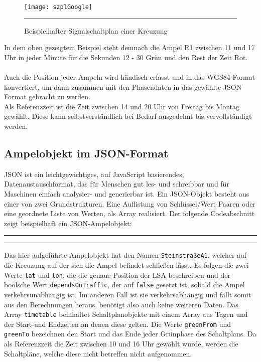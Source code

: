 \begin{figure}[H]
\centering
	\texttt{[image: szplGoogle]}
	\rule{36em}{0.5pt}
	\caption[Signalplan]{Beispielhafter Signalschaltplan einer Kreuzung}
	\label{fig:plan}	
\end{figure}
In dem oben gezeigtem Beispiel steht demnach die Ampel R1 zwischen 11 und 17 Uhr in jeder Minute für die Sekunden 12 - 30 Grün und den Rest der Zeit Rot.\\\\
Auch die Position jeder Ampeln wird händisch erfasst und in das WGS84-Format konvertiert, um dann zusammen mit den Phasendaten in das gewählte \gls{JSON}-Format gebracht zu werden.\\
Als Referenzzeit ist die Zeit zwischen 14 und 20 Uhr von Freitag bis Montag gewählt. Diese kann selbstverständlich bei Bedarf ausgedehnt bis vervollständigt werden.
%
%
\subsection[Ampelobjekt im JSON-Format]{Ampelobjekt im \gls{JSON}-Format}
\gls{JSON} ist ein leichtgewichtiges, auf JavaScript basierendes, Datenaustauschformat, das für Menschen gut les- und schreibbar und für Maschinen einfach analysier- und generierbar ist. Ein \gls{JSON}-Objekt besteht aus einer von zwei Grundstrukturen. Eine Auflistung von Schlüssel/Wert Paaren oder eine geordnete Liste von Werten, als Array realisiert. Der folgende Codeabschnitt zeigt beispielhaft ein \gls{JSON}-Ampelobjekt:  
\begin{center}
\rule{35em}{0.5pt}

\rule{35em}{0.5pt}
\end{center}
Das hier aufgeführte Ampelobjekt hat den Namen \texttt{SteinstraßeA1}, welcher auf die Kreuzung auf der sich die Ampel befindet schließen lässt. Es folgen die zwei Werte \texttt{lat} und \texttt{lon}, die die genaue Position der \gls{LSA} beschreiben und der boolsche Wert \texttt{dependsOnTraffic}, der auf \texttt{false} gesetzt ist, sobald die Ampel verkehrsunabhängig ist. Im anderen Fall ist sie verkehrsabhängig und fällt somit aus den Berechnungen heraus, benötigt also auch keine weiteren Daten. Das Array \texttt{timetable} beinhaltet Schaltplanobjekte mit einem Array aus Tagen und der Start-und Endzeiten an denen diese gelten. Die Werte \texttt{greenFrom} und \texttt{greenTo} bezeichnen den Start und das Ende jeder Grünphase des Schaltplans. Da als Referenzzeit die Zeit zwischen 10 und 16 Uhr gewählt wurde, werden die Schaltpläne, welche diese nicht betreffen nicht aufgenommen.
\clearpage

